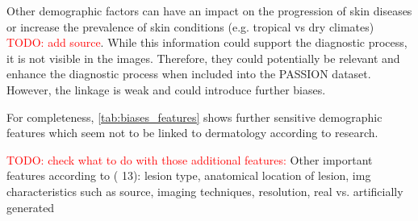 \documentclass[12pt, a4paper, oneside]{book}   	%
\renewcommand{\todo}[1]{\textcolor{red}{TODO: #1}}
\begin{document}
			Other demographic factors can have an impact on the progression of skin diseases or increase the prevalence of skin conditions (e.g. tropical vs dry climates) \todo{add source}. While this information could support the diagnostic process, it is not visible in the images. Therefore, they could potentially be relevant and enhance the diagnostic process when included into the PASSION dataset. However, the linkage is weak and could introduce further biases.
			
			For completeness, \ref{tab:biases_features} shows further sensitive demographic features which seem not to be linked to dermatology according to research.
			
			
			\todo{check what to do with those additional features:}
			Other important features according to (\autocite{Montoya_2025} 13):
			lesion type, anatomical location of lesion, img characteristics such as source, imaging techniques, resolution, real vs. artificially generated
\end{document}
